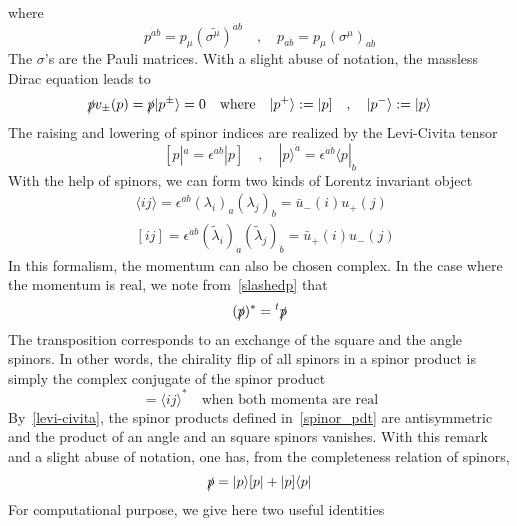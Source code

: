 where 
\begin{equation*}
p^{\dot{a}b} = p_\mu(\bar{\sigma^\mu})^{\dot{a}b}
\quad,\quad
p_{a\dot{b}} = p_\mu(\sigma^\mu)_{a\dot{b}}
\end{equation*}
The $\sigma$'s are the Pauli matrices.
With a slight abuse of notation, the massless Dirac equation leads to
\begin{equation*}
\slashed{p}v_\pm (p) = \slashed{p}|p^\pm\rangle = 0
\quad \mathrm{where}\quad
|p^+\rangle := |p]
\quad,\quad
|p^-\rangle := |p\rangle
\end{equation*}
The raising and lowering of spinor indices are realized by the Levi-Civita tensor
\begin{equation}\label{levi-civita}
[p|^a = \epsilon^{ab}|p] \quad,\quad
|p\rangle^{\dot{a}} = \epsilon^{\dot{a}\dot{b}}\langle p |_{\dot{b}}
\end{equation}
With the help of spinors, we can form two kinds of Lorentz invariant object
\begin{equation}\label{spinor_pdt}
\begin{split}
& \langle ij \rangle = \epsilon^{ab}(\lambda_i)_a(\lambda_j)_b = \bar{u}_-(i)u_+(j)
\\
& [ij] = \epsilon^{\dot{a}\dot{b}}(\tilde{\lambda}_i)_{\dot{a}}(\tilde{\lambda}_j)_{\dot{b}} = \bar{u}_+(i)u_-(j)
\end{split}
\end{equation}
In this formalism, the momentum can also be chosen complex. 
In the case where the momentum is real, we note from~\cref{slashedp} that
\begin{equation*}
(\slashed{p})^* = {}^t\slashed{p}
\end{equation*}
The transposition corresponds to an exchange of the square and the angle spinors. 
In other words, the chirality flip of all spinors in a spinor product is simply the complex conjugate of the spinor product
\begin{equation*}
[ij] = \langle ij \rangle^* \quad\textrm{when both momenta are real}
\end{equation*}
By~\cref{levi-civita}, the spinor products defined in~\cref{spinor_pdt} are antisymmetric and the product of an angle and an square spinors vanishes. 
With this remark and a slight abuse of notation, one has, from the completeness relation of spinors,
\begin{equation}\label{p_splinors}
\slashed{p} = |p\rangle [p| + |p]\langle p|
\end{equation}
For computational purpose, we give here two useful identities
